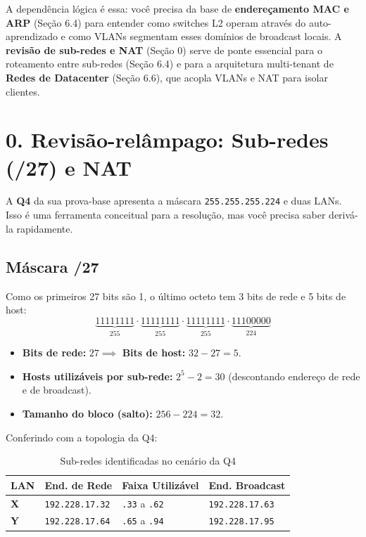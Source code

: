 \documentclass[11pt,a4paper]{article}
\begin{document}
A dependência lógica é essa: você precisa da base de \textbf{endereçamento MAC e ARP} (Seção 6.4) para entender como switches L2 operam através do auto-aprendizado e como VLANs segmentam esses domínios de broadcast locais. A \textbf{revisão de sub-redes e NAT} (Seção 0) serve de ponte essencial para o roteamento entre sub-redes (Seção 6.4) e para a arquitetura multi-tenant de \textbf{Redes de Datacenter} (Seção 6.6), que acopla VLANs e NAT para isolar clientes.

\hrulefill

\section*{0. Revisão-relâmpago: Sub-redes (/27) e NAT}

A \textbf{Q4} da sua prova-base apresenta a máscara \texttt{255.255.255.224} e duas LANs. Isso é uma ferramenta conceitual para a resolução, mas você precisa saber derivá-la rapidamente.

\subsection*{Máscara /27}

Como os primeiros 27 bits são 1, o último octeto tem 3 bits de rede e 5 bits de host:
\[
\underbrace{11111111}_{255} \cdot \underbrace{11111111}_{255} \cdot \underbrace{11111111}_{255} \cdot \underbrace{11100000}_{224}
\]
\begin{itemize}
    \item \textbf{Bits de rede:} $27 \implies$ \textbf{Bits de host:} $32 - 27 = 5$.
    \item \textbf{Hosts utilizáveis por sub-rede:} $2^5 - 2 = 30$ (descontando endereço de rede e de broadcast).
    \item \textbf{Tamanho do bloco (salto):} $256 - 224 = 32$.
\end{itemize}

Conferindo com a topologia da Q4:
\begin{table}[h!]
\centering
\caption{Sub-redes identificadas no cenário da Q4}
\label{tab:subredes_q4}
\begin{tabularx}{\textwidth}{lXXX}
\toprule
\textbf{LAN} & \textbf{End. de Rede} & \textbf{Faixa Utilizável} & \textbf{End. Broadcast} \\
\midrule
\textbf{X} & \texttt{192.228.17.32} & \texttt{.33} a \texttt{.62} & \texttt{192.228.17.63} \\
\textbf{Y} & \texttt{192.228.17.64} & \texttt{.65} a \texttt{.94} & \texttt{192.228.17.95} \\
\bottomrule
\end{tabularx}
\end{table}
\end{document}
